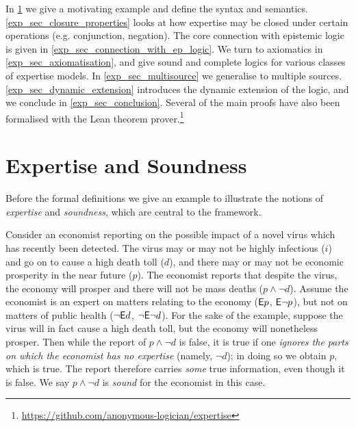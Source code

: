 \begin{chapteroutline}
    In \cref{exp_sec_expertise_and_soundness} we give a motivating example and
    define the syntax and semantics.  \cref{exp_sec_closure_properties} looks
    at how expertise may be closed under certain operations (e.g. conjunction,
    negation). The core connection with epistemic logic is given in
    \cref{exp_sec_connection_with_ep_logic}. We turn to axiomatics in
    \cref{exp_sec_axiomatisation}, and give sound and complete logics for
    various classes of expertise models. In \cref{exp_sec_multisource} we
    generalise to multiple sources. \cref{exp_sec_dynamic_extension} introduces
    the dynamic extension of the logic, and we conclude in
    \cref{exp_sec_conclusion}. Several of the main proofs have also been
    formalised with the Lean theorem
    prover.\footnote{\url{https://github.com/anonymous-logician/expertise}}
\end{chapteroutline}

\section{Expertise and Soundness}
\label{exp_sec_expertise_and_soundness}

Before the formal definitions we give an example to illustrate the notions of
\emph{expertise} and \emph{soundness}, which are central to the framework.

\begin{example}
    \label{exp_ex_economist_motivation}

    Consider an economist reporting on the possible impact of a novel virus
    which has recently been detected. The virus may or may not be highly
    infectious ($i$) and go on to cause a high death toll ($d$), and there may
    or may not be economic prosperity in the near future ($p$). The economist
    reports that despite the virus, the economy will prosper and there will not
    be mass deaths ($p \land \neg d$). Assume the economist is an expert on
    matters relating to the economy ($\mathsf{E} p$, $\mathsf{E}\neg p$), but not on matters of
    public health ($\neg\mathsf{E} d$, $\neg\mathsf{E}\neg d$). For the sake of the example,
    suppose the virus will in fact cause a high death toll, but the economy
    will nonetheless prosper. Then while the report of $p \land \neg d$ is
    false, it is true if one \emph{ignores the parts on which the economist has
    no expertise} (namely, $\neg d$); in doing so we obtain $p$, which is true.
    The report therefore carries \emph{some} true information, even though it
    is false. We say $p \land \neg d$ is \emph{sound} for the economist in this
    case.

\end{example}

